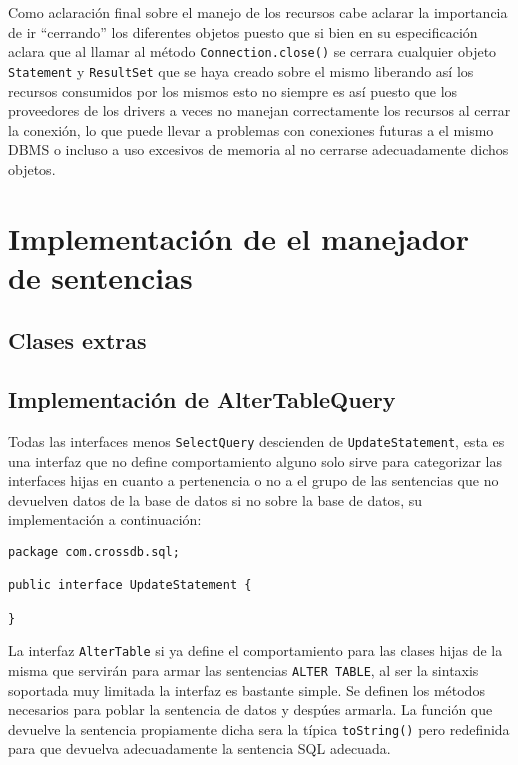 Como aclaración final sobre el manejo de los recursos cabe aclarar la importancia de ir ``cerrando'' los diferentes objetos puesto que si bien \jd en su especificación aclara que al llamar al método \verb=Connection.close()= se cerrara cualquier objeto \verb=Statement= y \verb=ResultSet= que se haya creado sobre el mismo liberando así los recursos consumidos por los mismos esto no siempre es así puesto que los proveedores de los drivers \jd a veces no manejan correctamente los recursos al cerrar la conexión, lo que puede llevar a problemas con conexiones futuras a el mismo DBMS o incluso a uso excesivos de memoria al no cerrarse adecuadamente dichos objetos.

\section{Implementación de el manejador de sentencias}



\subsection{Clases extras}\label{sec:extras}


\subsection{Implementación de AlterTableQuery}
Todas las interfaces menos \verb=SelectQuery= descienden de \verb=UpdateStatement=, esta es una interfaz que no define comportamiento alguno solo sirve para categorizar las interfaces hijas en cuanto a pertenencia o no a el grupo de las sentencias que no devuelven datos de la base de datos si no sobre la base de datos, su implementación a continuación:

\begin{lstlisting}[title=interfaz UpdateStatement]
package com.crossdb.sql;

public interface UpdateStatement {

}
\end{lstlisting}

La interfaz \verb=AlterTable= si ya define el comportamiento para las clases hijas de la misma que servirán para armar las sentencias \verb=ALTER TABLE=, al ser la sintaxis soportada muy limitada la interfaz es bastante simple. Se definen los métodos necesarios para poblar la sentencia de datos y despúes armarla. La función que devuelve la sentencia propiamente dicha sera la típica \verb=toString()= pero redefinida para que devuelva adecuadamente la sentencia SQL adecuada. 

